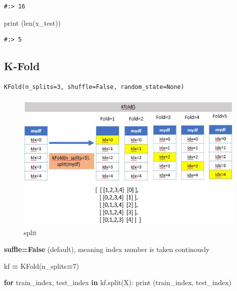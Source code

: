 \documentclass[
]{book}
\newenvironment{Shaded}{\begin{snugshade}}{\end{snugshade}}
\newcommand{\BuiltInTok}[1]{#1}
\newcommand{\ControlFlowTok}[1]{\textcolor[rgb]{0.27,0.27,0.27}{\textbf{#1}}}
\newcommand{\DecValTok}[1]{\textcolor[rgb]{0.06,0.06,0.06}{#1}}
\newcommand{\KeywordTok}[1]{\textcolor[rgb]{0.27,0.27,0.27}{\textbf{#1}}}
\newcommand{\NormalTok}[1]{#1}
\newcommand{\OperatorTok}[1]{\textcolor[rgb]{0.43,0.43,0.43}{\textbf{#1}}}
\begin{document}
\begin{verbatim}
#:> 16
\end{verbatim}

\begin{Shaded}
\begin{Highlighting}[]
\BuiltInTok{print}\NormalTok{ (}\BuiltInTok{len}\NormalTok{(x_test))}
\end{Highlighting}
\end{Shaded}

\begin{verbatim}
#:> 5
\end{verbatim}

\hypertarget{k-fold}{%
\subsection{K-Fold}\label{k-fold}}

\begin{verbatim}
KFold(n_splits=3, shuffle=False, random_state=None)
\end{verbatim}

\begin{figure}
\centering
\includegraphics{img/kfold.jpg}
\caption{split}
\end{figure}

\textbf{suffle=False} (default), meaning index number is taken continously

\begin{Shaded}
\begin{Highlighting}[]
\NormalTok{kf }\OperatorTok{=}\NormalTok{ KFold(n_splits}\OperatorTok{=}\DecValTok{7}\NormalTok{)}
\end{Highlighting}
\end{Shaded}

\begin{Shaded}
\begin{Highlighting}[]
\ControlFlowTok{for}\NormalTok{ train_index, test_index }\KeywordTok{in}\NormalTok{ kf.split(X):}
  \BuiltInTok{print}\NormalTok{ (train_index, test_index)}
\end{Highlighting}
\end{Shaded}
\end{document}
